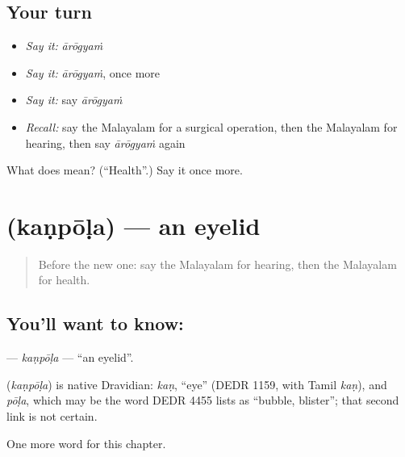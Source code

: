 \subsection*{Your turn}
\begin{itemize}
\raggedright
  \item \emph{Say it:} \emph{ārōgyaṁ}
  \item \emph{Say it:} \emph{ārōgyaṁ}, once more
  \item \emph{Say it:} say \emph{ārōgyaṁ}
  \item \emph{Recall:} say the Malayalam for a surgical operation, then the Malayalam for hearing, then say \emph{ārōgyaṁ} again
\end{itemize}

\begin{tcolorbox}[breakable,colback=teal!4,colframe=teal!35!black,title={Before you move on}]
What does  mean? (\textquotedblleft{}Health\textquotedblright{}.) Say it once more.
\end{tcolorbox}
\section[\texorpdfstring{\ml{കൺപോള} (kaṇpōḷa)}{കൺപോള (kaṇpōḷa)}]{ (kaṇpōḷa) — an eyelid}

\label{lesson:ML-C194-kanpola}



\begin{quote}
Before the new one: say the Malayalam for hearing, then the Malayalam for health.
\end{quote}

\subsection*{You'll want to know: }
\textbf{} — \emph{kaṇpōḷa} — \textquotedblleft{}an eyelid\textquotedblright{}.

\begin{cousinweb}
\textbf{} (\emph{kaṇpōḷa}) is native Dravidian: \emph{kaṇ}, \textquotedblleft{}eye\textquotedblright{} (DEDR 1159, with Tamil \emph{kaṇ}), and \emph{pōḷa}, which may be the word DEDR 4455 lists as \textquotedblleft{}bubble, blister\textquotedblright{}; that second link is not certain.
\end{cousinweb}

\begin{grammarlens}[title={What you've built}]
One more word for this chapter.
\end{grammarlens}

